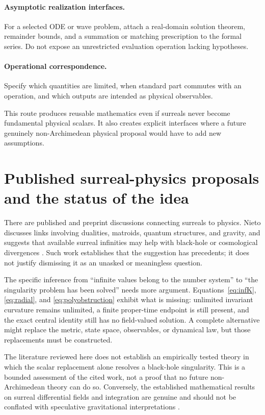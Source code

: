\documentclass[11pt,letterpaper]{article}
\theoremstyle{definition}
\theoremstyle{remark}
\begin{document}
\paragraph{Asymptotic realization interfaces.}
For a selected ODE or wave problem, attach a real-domain solution theorem,
remainder bounds, and a summation or matching prescription to the formal
series. Do not expose an unrestricted evaluation operation lacking hypotheses.
\paragraph{Operational correspondence.}
Specify which quantities are limited, when standard part commutes with an
operation, and which outputs are intended as physical observables.


This route produces reusable mathematics even if surreals never become
fundamental physical scalars. It also creates explicit interfaces where a
future genuinely non-Archimedean physical proposal would have to add new
assumptions.

\section{Published surreal-physics proposals and the status of the idea}
\label{sec:literaturestatus}

There are published and preprint discussions connecting surreals to physics.
Nieto discusses links involving dualities, matroids, quantum structures, and
gravity, and suggests that available surreal infinities may help with
black-hole or cosmological divergences \cite{Nieto2016,Nieto2018}. Such work
establishes that the suggestion has precedents; it does not justify dismissing
it as an unasked or meaningless question.

The specific inference from ``infinite values belong to the number system''
to ``the singularity problem has been solved'' needs more argument.
Equations~\eqref{eq:infK}, \eqref{eq:radial}, and \eqref{eq:polyobstruction}
exhibit what is missing: unlimited invariant curvature remains unlimited, a
finite proper-time endpoint is still present, and the exact central identity
still has no field-valued solution. A complete alternative might replace the
metric, state space, observables, or dynamical law, but those replacements
must be constructed.

The literature reviewed here does not establish an empirically tested theory
in which the scalar replacement alone resolves a black-hole singularity.
This is a bounded assessment of the cited work, not a proof that no future
non-Archimedean theory can do so. Conversely, the established mathematical
results on surreal differential fields and integration are genuine and should
not be conflated with speculative gravitational interpretations
\cite{BerarducciMantova,ADH,CostinEhrlich}.
\end{document}
